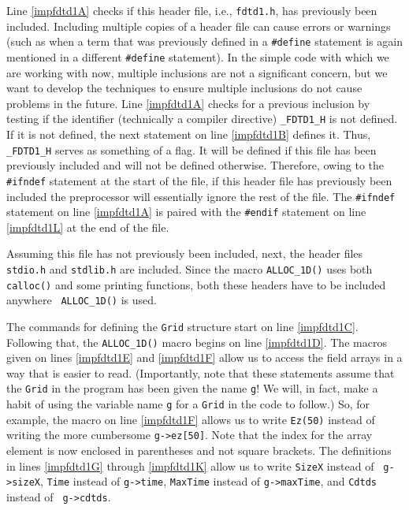 Line \ref{impfdtd1A} checks if this header file, i.e., {\tt fdtd1.h},
has previously been included.  Including multiple copies of a header
file can cause errors or warnings (such as when a term that was
previously defined in a {\tt \#define} statement is again mentioned in
a different {\tt \#define} statement).  In the simple code with which
we are working with now, multiple inclusions are not a significant
concern, but we want to develop the techniques to ensure multiple
inclusions do not cause problems in the future.  Line \ref{impfdtd1A}
checks for a previous inclusion by testing if the identifier
(technically a compiler directive) {\tt \_FDTD1\_H} is not defined.
If it is not defined, the next statement on line \ref{impfdtd1B}
defines it.  Thus, {\tt \_FDTD1\_H} serves as something of a flag.  It
will be defined if this file has been previously included and will not
be defined otherwise.  Therefore, owing to the {\tt \#ifndef}
statement at the start of the file, if this header file has previously
been included the preprocessor will essentially ignore the rest of the
file.  The {\tt \#ifndef} statement on line \ref{impfdtd1A} is paired
with the {\tt \#endif} statement on line \ref{impfdtd1L} at the end of
the file.

Assuming this file has not previously been included, next,
the header files {\tt stdio.h} and {\tt stdlib.h} are included.  Since
the macro {\tt ALLOC\_1D()} uses both {\tt calloc()} and some printing
functions, both these headers have to be included anywhere {\tt
  ALLOC\_1D()} is used.

The commands for defining the {\tt Grid} structure start on line
\ref{impfdtd1C}.  Following that, the {\tt ALLOC\_1D()} macro begins
on line \ref{impfdtd1D}.  The macros given on lines \ref{impfdtd1E}
and \ref{impfdtd1F} allow us to access the field arrays in a way that
is easier to read.  (Importantly, note that these statements assume
that the {\tt Grid} in the program has been given the name {\tt g}!
We will, in fact, make a habit of using the variable name {\tt g} for
a {\tt Grid} in the code to follow.)  So, for example, the macro on
line \ref{impfdtd1F} allows us to write {\tt Ez(50)} instead of
writing the more cumbersome \verb+g->ez[50]+.  Note that the index for
the array element is now enclosed in parentheses and not square
brackets.  The definitions in lines \ref{impfdtd1G} through
\ref{impfdtd1K} allow us to write {\tt SizeX} instead of {\tt
  g->sizeX}, {\tt Time} instead of {\tt g->time}, {\tt MaxTime}
instead of {\tt g->maxTime}, and {\tt Cdtds} instead of {\tt
  g->cdtds}.

